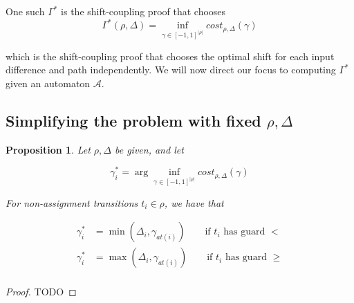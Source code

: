 \documentclass{article}
\newtheorem{proposition}{Proposition}[section]
\newtheorem{corollary}{Corollary}[theorem]
\renewcommand{\epsilon}{\varepsilon}
\newcommand{\1}{\langle 1 \rangle}
\newcommand{\2}{\langle 2 \rangle}
\begin{document}
One such $\Gamma^*$ is the shift-coupling proof that chooses \[\Gamma^*(\rho, \Delta) = \inf_{\gamma \in [-1, 1]^{|\rho|}} cost_{\rho, \Delta} (\gamma)\]

which is the shift-coupling proof that chooses the optimal shift for each input difference and path independently. We will now direct our focus to computing $\Gamma^*$ given an automaton $\mathcal{A}$.

\subsection{Simplifying the problem with fixed $\rho, \Delta$}

\begin{proposition}
    \label{prop:gammas_non_assignment}
    Let $\rho, \Delta$ be given, and let 
    
    \[\gamma_i^* = \arg \inf_{\gamma \in [-1, 1]^{|\rho|}} cost_{\rho, \Delta} (\gamma)\]
    
    For non-assignment transitions $t_i \in \rho$, we have that 

    \begin{align*}
        \gamma_i^* &= \min(\Delta_i, \gamma_{at(i)}) \qquad \text{if } t_i \text{ has guard } < \\
        \gamma_i^* &= \max(\Delta_i, \gamma_{at(i)}) \qquad \text{if } t_i \text{ has guard } \geq \\
    \end{align*}
\end{proposition}

\begin{proof}
    TODO
\end{proof}



\end{document}
